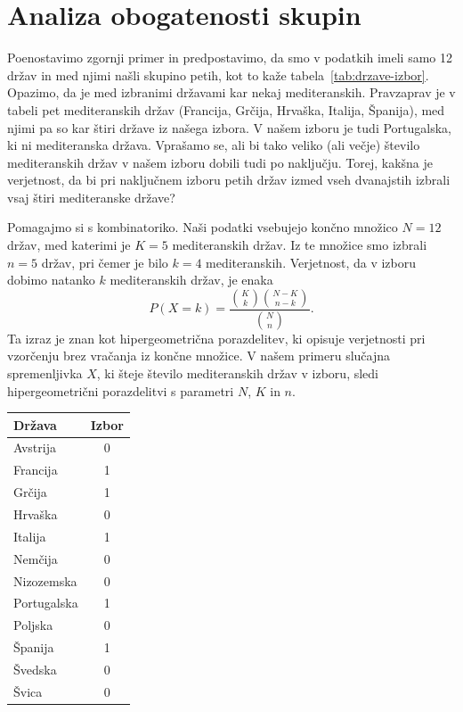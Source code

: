 \section{Analiza obogatenosti skupin}

Poenostavimo zgornji primer in predpostavimo, da smo v podatkih imeli samo 12 držav in med njimi našli skupino petih, kot to kaže tabela~\ref{tab:drzave-izbor}. Opazimo, da je med izbranimi državami kar nekaj mediteranskih.
%
%
Pravzaprav je v tabeli pet mediteranskih držav (Francija, Grčija, Hrvaška, Italija, Španija), med njimi pa so kar štiri države iz našega izbora. V našem izboru je tudi Portugalska, ki ni mediteranska država. Vprašamo se, ali bi tako veliko (ali večje) število mediteranskih držav v našem izboru dobili tudi po naključju. Torej, kakšna je verjetnost, da bi pri naključnem izboru petih držav izmed vseh dvanajstih izbrali vsaj štiri mediteranske države?

Pomagajmo si s kombinatoriko. Naši podatki vsebujejo končno množico $N=12$ držav, med katerimi je $K=5$ mediteranskih držav. Iz te množice smo izbrali $n=5$ držav, pri čemer je bilo $k=4$ mediteranskih. Verjetnost, da v izboru dobimo natanko \(k\) mediteranskih držav, je enaka
\[
P(X=k)=\frac{\binom{K}{k}\binom{N-K}{n-k}}{\binom{N}{n}}.
\]
Ta izraz je znan kot hipergeometrična porazdelitev, ki opisuje verjetnosti pri vzorčenju brez vračanja iz končne množice. V našem primeru slučajna spremenljivka \(X\), ki šteje število mediteranskih držav v izboru, sledi hipergeometrični porazdelitvi s parametri \(N\), \(K\) in \(n\).

\begin{margintable}
\caption{Države in njihov izbor. Izbrane države so označene v koloni ``Izbor'' z 1, ostale z 0.}
\vspace{2mm}
\begin{tabular}{lc}
\toprule
Država & Izbor \\
\midrule
Avstrija     & 0 \\
Francija     & 1 \\
Grčija       & 1 \\
Hrvaška      & 0 \\
Italija      & 1 \\
Nemčija      & 0 \\
Nizozemska   & 0 \\
Portugalska  & 1 \\
Poljska      & 0 \\
Španija      & 1 \\
Švedska      & 0 \\
Švica        & 0 \\
\bottomrule
\end{tabular}
\label{tab:drzave-izbor}
\end{margintable}

